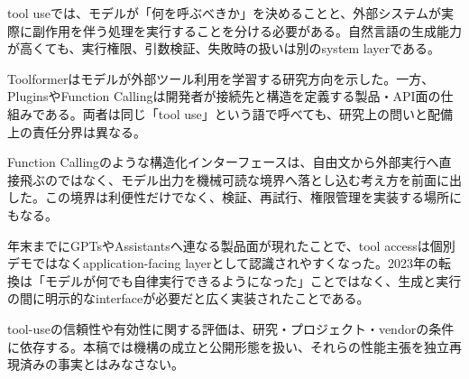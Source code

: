 
tool useでは、モデルが「何を呼ぶべきか」を決めることと、外部システムが実際に副作用を伴う処理を実行することを分ける必要がある。自然言語の生成能力が高くても、実行権限、引数検証、失敗時の扱いは別のsystem layerである。\autocite{src-150e07b331df,src-4de1cea0a896,src-6b76b870b4ae,src-97786632d087,src-e17d0bf10781}


Toolformerはモデルが外部ツール利用を学習する研究方向を示した。一方、PluginsやFunction Callingは開発者が接続先と構造を定義する製品・API面の仕組みである。両者は同じ「tool use」という語で呼べても、研究上の問いと配備上の責任分界は異なる。\autocite{src-150e07b331df,src-4de1cea0a896,src-6b76b870b4ae,src-97786632d087,src-e17d0bf10781}


Function Callingのような構造化インターフェースは、自由文から外部実行へ直接飛ぶのではなく、モデル出力を機械可読な境界へ落とし込む考え方を前面に出した。この境界は利便性だけでなく、検証、再試行、権限管理を実装する場所にもなる。\autocite{src-4de1cea0a896,src-6b76b870b4ae,src-97786632d087,src-e17d0bf10781}


年末までにGPTsやAssistantsへ連なる製品面が現れたことで、tool accessは個別デモではなくapplication-facing layerとして認識されやすくなった。2023年の転換は「モデルが何でも自律実行できるようになった」ことではなく、生成と実行の間に明示的なinterfaceが必要だと広く実装されたことである。\autocite{src-4de1cea0a896,src-6b76b870b4ae,src-97786632d087,src-e17d0bf10781}


\begin{claimboundary}
tool-useの信頼性や有効性に関する評価は、研究・プロジェクト・vendorの条件に依存する。本稿では機構の成立と公開形態を扱い、それらの性能主張を独立再現済みの事実とはみなさない。\autocite{src-4de1cea0a896,src-6b76b870b4ae,src-97786632d087,src-e17d0bf10781}
\end{claimboundary}
